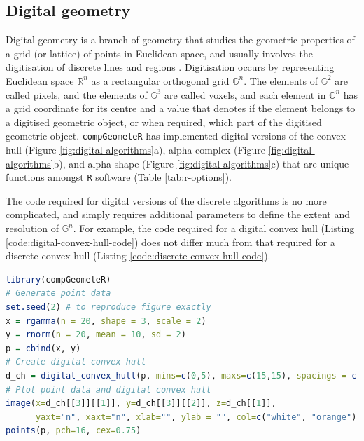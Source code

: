 \documentclass[12pt, a4paper]{article}
\begin{document}
\subsection{Digital geometry}

Digital geometry is a branch of geometry that studies the geometric properties of a grid (or lattice) of points in Euclidean space, and usually involves the digitisation of discrete lines and regions \citep{rosenfeld-1989}.  Digitisation occurs by representing Euclidean space $\mathbb{R}^n$ as a  rectangular orthogonal grid $\mathbb{G}^n$.  The elements of $\mathbb{G}^2$ are called pixels, and the elements of $\mathbb{G}^3$ are called voxels, and each element in $\mathbb{G}^n$ has a grid coordinate for its centre \citep{klette-2004} and a value that denotes if the element belongs to a digitised geometric object, or when required, which part of the digitised geometric object.  \texttt{compGeometeR} has implemented digital versions of the convex hull (Figure \ref{fig:digital-algorithms}a), alpha complex (Figure \ref{fig:digital-algorithms}b), and alpha shape (Figure \ref{fig:digital-algorithms}c) that are unique functions amongst \texttt{R} software (Table \ref{tab:r-options}).

The code required for digital versions of the discrete algorithms is no more complicated, and simply requires additional parameters to define the extent and resolution of $\mathbb{G}^n$.  For example, the code required for a digital convex hull (Listing \ref{code:digital-convex-hull-code}) does not differ much from that required for a discrete convex hull (Listing \ref{code:discrete-convex-hull-code}).

\begin{lstlisting}[language=R, caption=Example \texttt{R} code to create a digital convex hull with \texttt{compGeometeR}, label={code:digital-convex-hull-code}]
library(compGeometeR)
# Generate point data
set.seed(2) # to reproduce figure exactly
x = rgamma(n = 20, shape = 3, scale = 2)
y = rnorm(n = 20, mean = 10, sd = 2)
p = cbind(x, y)
# Create digital convex hull
d_ch = digital_convex_hull(p, mins=c(0,5), maxs=c(15,15), spacings = c(0.05,0.05))
# Plot point data and digital convex hull
image(x=d_ch[[3]][[1]], y=d_ch[[3]][[2]], z=d_ch[[1]], 
      yaxt="n", xaxt="n", xlab="", ylab = "", col=c("white", "orange"))
points(p, pch=16, cex=0.75)
\end{lstlisting}
\end{document}
